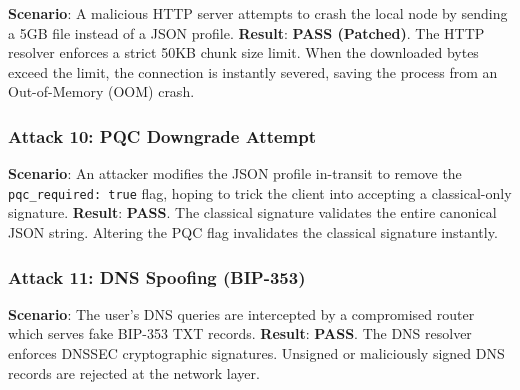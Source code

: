 \documentclass[
]{article}
\begin{document}
\textbf{Scenario}: A malicious HTTP server attempts to crash the local
node by sending a 5GB file instead of a JSON profile. \textbf{Result}:
\textbf{PASS (Patched)}. The HTTP resolver enforces a strict 50KB chunk
size limit. When the downloaded bytes exceed the limit, the connection
is instantly severed, saving the process from an Out-of-Memory (OOM)
crash.

\hypertarget{attack-10-pqc-downgrade-attempt}{%
\subsubsection{Attack 10: PQC Downgrade
Attempt}\label{attack-10-pqc-downgrade-attempt}}

\textbf{Scenario}: An attacker modifies the JSON profile in-transit to
remove the \texttt{pqc\_required:\ true} flag, hoping to trick the
client into accepting a classical-only signature. \textbf{Result}:
\textbf{PASS}. The classical signature validates the entire canonical
JSON string. Altering the PQC flag invalidates the classical signature
instantly.

\hypertarget{attack-11-dns-spoofing-bip-353}{%
\subsubsection{Attack 11: DNS Spoofing
(BIP-353)}\label{attack-11-dns-spoofing-bip-353}}

\textbf{Scenario}: The user's DNS queries are intercepted by a
compromised router which serves fake BIP-353 TXT records.
\textbf{Result}: \textbf{PASS}. The DNS resolver enforces DNSSEC
cryptographic signatures. Unsigned or maliciously signed DNS records are
rejected at the network layer.
\end{document}
